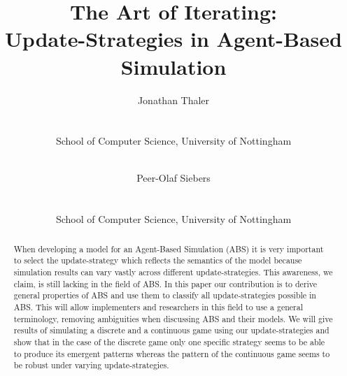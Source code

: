 \documentclass[a4paper, 10pt, conference]{IEEEconf}
\title{The Art of Iterating:\\Update-Strategies in Agent-Based Simulation}
\author{
	Jonathan Thaler \\
	\email{jonathan.thaler@nottingham.ac.uk} \\
	\begin{affiliation}
		School of Computer Science, University of Nottingham
	\end{affiliation} \\
	\and 
	Peer-Olaf Siebers \\
	\email{peer-olaf.siebers@nottingham.ac.uk} \\
	\begin{affiliation}
		School of Computer Science, University of Nottingham
	\end{affiliation} 
}
\begin{document}
\maketitle

\begin{abstract}
When developing a model for an Agent-Based Simulation (ABS) it is very important to select the update-strategy which reflects the semantics of the model because simulation results can vary vastly across different update-strategies. This awareness, we claim, is still lacking in the field of ABS. In this paper our contribution is to derive general properties of ABS and use them to classify all update-strategies possible in ABS. This will allow implementers and researchers in this field to use a general terminology, removing ambiguities when discussing ABS and their models. We will give results of simulating a discrete and a continuous game using our update-strategies and show that in the case of the discrete game only one specific strategy seems to be able to produce its emergent patterns whereas the pattern of the continuous game seems to be robust under varying update-strategies.
\end{abstract}













%
%
\end{document}
